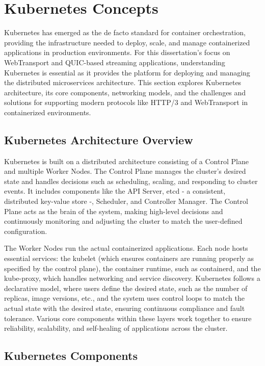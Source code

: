 \section{Kubernetes Concepts}

Kubernetes has emerged as the de facto standard for container orchestration, providing the infrastructure needed to deploy, scale, and manage containerized applications in production environments. For this dissertation's focus on WebTransport and QUIC-based streaming applications, understanding Kubernetes is essential as it provides the platform for deploying and managing the distributed microservices architecture. This section explores Kubernetes architecture, its core components, networking models, and the challenges and solutions for supporting modern protocols like HTTP/3 and WebTransport in containerized environments.

\subsection{Kubernetes Architecture Overview}
Kubernetes is built on a distributed architecture consisting of a Control Plane and multiple Worker Nodes. The Control Plane manages the cluster's desired state and handles decisions such as scheduling, scaling, and responding to cluster events. It includes components like the API Server, etcd - a consistent, distributed key-value store -, Scheduler, and Controller Manager. The Control Plane acts as the brain of the system, making high-level decisions and continuously monitoring and adjusting the cluster to match the user-defined configuration.

The Worker Nodes run the actual containerized applications. Each node hosts essential services: the kubelet (which ensures containers are running properly as specified by the control plane), the container runtime, such as containerd, and the kube-proxy, which handles networking and service discovery. Kubernetes follows a declarative model, where users define the desired state, such as the number of replicas, image versions, etc., and the system uses control loops to match the actual state with the desired state, ensuring continuous compliance and fault tolerance. Various core components within these layers work together to ensure reliability, scalability, and self-healing of applications across the cluster.

\subsection{Kubernetes Components}

